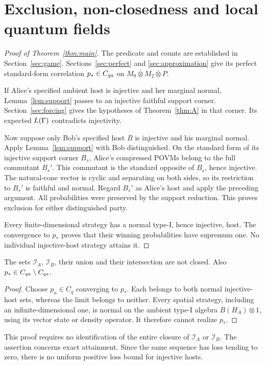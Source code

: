\section{Exclusion, non-closedness and local quantum fields}\label{sec:consequences}
\begin{proof}[Proof of Theorem~\ref{thm:main}]
The predicate and counts are established in Section~\ref{sec:game}. Sections~\ref{sec:perfect} and \ref{sec:approximation} give its perfect standard-form correlation $p_*\in C_{qa}$ on $M_9\bar\otimes M_2\bar\otimes P$.

If Alice's specified ambient host is injective and her marginal normal, Lemma~\ref{lem:support} passes to an injective faithful support corner. Section~\ref{sec:forcing} gives the hypotheses of Theorem~\ref{thm:A} in that corner. Its expected $L(\Gamma)$ contradicts injectivity.

Now suppose only Bob's specified host $B$ is injective and his marginal normal. Apply Lemma~\ref{lem:support} with Bob distinguished. On the standard form of its injective support corner $B_s$, Alice's compressed POVMs belong to the full commutant $B_s'$. This commutant is the standard opposite of $B_s$, hence injective. The natural-cone vector is cyclic and separating on both sides, so its restriction to $B_s'$ is faithful and normal. Regard $B_s'$ as Alice's host and apply the preceding argument. All probabilities were preserved by the support reduction. This proves exclusion for either distinguished party.

Every finite-dimensional strategy has a normal type-I, hence injective, host. The convergence to $p_*$ proves that their winning probabilities have supremum one. No individual injective-host strategy attains it.
\end{proof}

\begin{corollary}\label{cor:nonclosed}
The sets $\mathcal I_A$, $\mathcal I_B$, their union and their intersection are not closed. Also $p_*\in C_{qa}\setminus C_{qs}$.
\end{corollary}
\begin{proof}
Choose $p_n\in C_q$ converging to $p_*$. Each belongs to both normal injective-host sets, whereas the limit belongs to neither. Every spatial strategy, including an infinite-dimensional one, is normal on the ambient type-I algebra $B(H_A)\otimes1$, using its vector state or density operator. It therefore cannot realize $p_*$.
\end{proof}
This proof requires no identification of the entire closure of $\mathcal I_A$ or $\mathcal I_B$. The assertion concerns exact attainment. Since the same sequence has loss tending to zero, there is no uniform positive loss bound for injective hosts.

